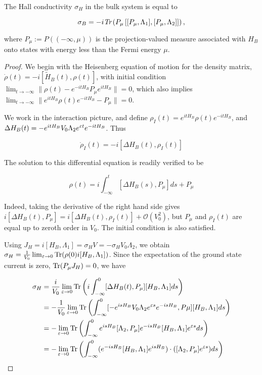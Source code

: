 \documentclass[12pt, letterpaper]{article}
\begin{document}
\begin{proposition}

The Hall conductivity $\sigma_H$ in the bulk system is equal to 

\[\sigma_B = -i\emph{Tr}\left(P_\mu \left[[P_\mu,\Lambda_1],[P_\mu,\Lambda_2]\right]\right),\]

where $P_\mu := P((-\infty,\mu))$ is the projection-valued measure associated with $H_B$ onto states with energy less than the Fermi energy $\mu$.
\end{proposition}
\begin{proof}
We begin with the Heisenberg equation of motion for the density matrix, $\dot{\rho}(t) = - i[\widetilde{H}_B(t),\rho(t)]$, with initial condition $\lim_{t\to-\infty} \|\rho(t) - e^{-itH_B}P_\mu e^{itH_B}\| = 0$, which also implies $\lim_{t\to-\infty} \|e^{itH_B}\rho(t)e^{-itH_B} - P_\mu\| = 0$.

We work in the interaction picture, and define $\rho_I(t) = e^{itH_B}\rho(t)e^{-itH_B}$, and $\Delta H_B(t) = -e^{itH_B}V_0\Lambda_2 e^{\varepsilon t}e^{-itH_B}$. Thus

\[\dot{\rho}_I(t) = -i[\Delta H_B(t), \rho_I(t)]\]

The solution to this differential equation is readily verified to be

\[\rho(t) = i\int_{-\infty}^t [\Delta H_B(s), P_\mu]ds + P_\mu \]

Indeed, taking the derivative of the right hand side gives $i[\Delta H_B(t), P_\mu] = i[\Delta H_B(t), \rho_I(t)] + \mathcal{O}(V_0^2)$, but $P_\mu$ and $\rho_I(t)$ are equal up to zeroth order in $V_0$. The initial condition is also satisfied. 

Using $J_H = i[H_B,\Lambda_1] = \sigma_H V = -\sigma_H V_0\Lambda_2$, we obtain $\sigma_H = \frac{1}{V_0} \lim_{\varepsilon\to 0} \text{Tr}(\rho(0)i[H_B,\Lambda_1])$. Since the expectation of the ground state current is zero, $\text{Tr}(P_\mu J_H) =0$, we have

\[\begin{aligned}
\sigma_H &= \frac{i}{V_0} \lim_{\varepsilon\to 0}\text{Tr} \left( i\int_{-\infty}^0 [\Delta H_B(t), P_\mu] [H_B,\Lambda_1] ds\right)\\
&= -\frac{1}{V_0} \lim_{\varepsilon\to 0}\text{Tr} \left( \int_{-\infty}^0 [-e^{isH_B}V_0\Lambda_2 e^{\varepsilon s}e^{-isH_B}, P\mu] [H_B,\Lambda_1] ds\right)\\
&= -\lim_{\varepsilon\to 0}\text{Tr} \left( \int_{-\infty}^0 e^{isH_B}[\Lambda_2, P_\mu]e^{-isH_B}[H_B,\Lambda_1] e^{\varepsilon s}ds\right)\\
&= -\lim_{\varepsilon\to 0}\text{Tr} \left( \int_{-\infty}^0 (e^{-isH_B}[H_B,\Lambda_1]e^{isH_B})\cdot([\Lambda_2, P_\mu] e^{\varepsilon s})ds\right)\\
\end{aligned}\]


\end{proof}
\end{document}
